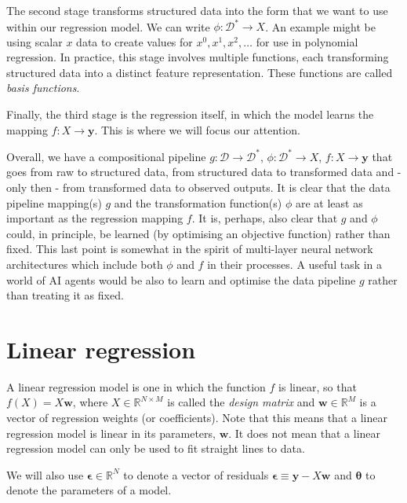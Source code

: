 \documentclass[11pt]{article}
\begin{document}
	The second stage transforms structured data into the form that we want to use within our regression model. We can write $\phi: \mathcal{D}^{*} \rightarrow X$. An example might be using scalar $x$ data to create values for $x^{0}, x^{1}, x^{2}, \dots$ for use in polynomial regression. In practice, this stage involves multiple functions, each transforming structured data into a distinct feature representation. These functions are called \emph{basis functions}.
	
	Finally, the third stage is the regression itself, in which the model learns the mapping $f: X \rightarrow \boldsymbol{y}$. This is where we will focus our attention.
	
	Overall, we have a compositional pipeline $g: \mathcal{D} \rightarrow \mathcal{D}^{*}$, $\phi: \mathcal{D}^{*} \rightarrow X$, $f: X \rightarrow \boldsymbol{y}$ that goes from raw to structured data, from structured data to transformed data and - only then - from transformed data to observed outputs. It is clear that the data pipeline mapping(s) $g$ and the transformation function(s) $\phi$ are at least as important as the regression mapping $f$. It is, perhaps, also clear that $g$ and $\phi$ could, in principle, be learned (by optimising an objective function) rather than fixed. This last point is somewhat in the spirit of multi-layer neural network architectures which include both $\phi$ and $f$ in their processes. A useful task in a world of AI agents would be also to learn and optimise the data pipeline $g$ rather than treating it as fixed.
	
	\section{Linear regression}
	
	A linear regression model is one in which the function $f$ is linear, so that $f(X) = X\boldsymbol{w}$, where $X \in \mathbb{R}^{N \times M}$ is called the \emph{design matrix} and $\boldsymbol{w} \in \mathbb{R}^{M}$ is a vector of regression weights (or coefficients). Note that this means that a linear regression model is linear in its parameters, $\boldsymbol{w}$. It does not mean that a linear regression model can only be used to fit straight lines to data.
	
	We will also use $\boldsymbol{\epsilon} \in \mathbb{R}^{N}$ to denote a vector of residuals $\boldsymbol{\epsilon} \equiv \boldsymbol{y} - X\boldsymbol{w}$ and $\boldsymbol{\theta}$ to denote the parameters of a model.
	
\end{document}
